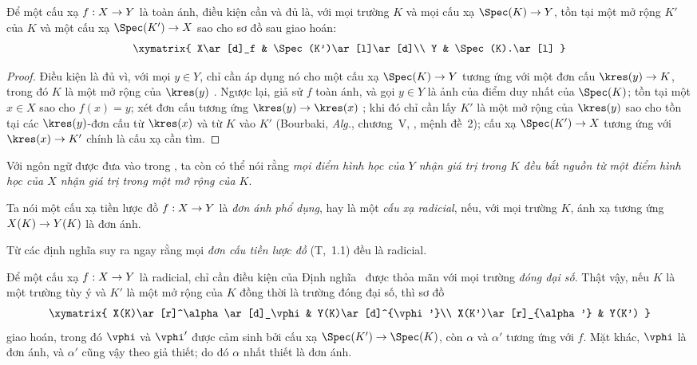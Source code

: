 \documentclass[oneside]{amsart}
\makeatletter
\newcommand{\ega@arrow}[2]{\mathchoice{#1}{#2}{#2}{#2}}
\renewcommand{\to}{\ega@arrow{\longrightarrow}{\rightarrow}}
\newcommand{\oldpage}[2][]{{\marginnote{\normalfont\textbf{#1}~|~#2}}\ignorespaces}
\let\EGAOriginalLabel\label
\renewcommand{\label}[1]{\phantomsection\EGAOriginalLabel{#1}}
\makeatother
\begin{document}
\begin{proposition}[3.5.3]
\label{I.3.5.3}
Để một cấu xạ $f:X\to Y$ là toàn ánh, điều kiện cần và đủ là, với mọi trường
$K$ và mọi cấu xạ $\Spec(K)\to Y$, tồn tại một mở rộng $K'$ của $K$ và một
cấu xạ $\Spec(K')\to X$ sao cho sơ đồ sau giao hoán:
\[
  \xymatrix{
    X\ar[d]_f &
    \Spec(K')\ar[l]\ar[d]\\
    Y &
    \Spec(K).\ar[l]
  }
\]
\end{proposition}

\begin{proof}
Điều kiện là đủ vì, với mọi $y\in Y$, chỉ cần áp dụng nó cho một cấu xạ
$\Spec(K)\to Y$ tương ứng với một đơn cấu $\kres(y)\to K$, trong đó $K$ là
một mở rộng của $\kres(y)$ .
Ngược lại, giả sử $f$ toàn ánh, và gọi $y\in Y$ là ảnh của điểm duy nhất của
$\Spec(K)$; tồn tại một $x\in X$ sao cho $f(x)=y$; xét đơn cấu tương ứng
$\kres(y)\to\kres(x)$ ; khi đó chỉ cần lấy $K'$ là một mở rộng
của $\kres(y)$ sao cho tồn tại các $\kres(y)$-đơn cấu từ $\kres(x)$ và từ
$K$ vào $K'$ (Bourbaki, \emph{Alg.}, chương~V, , mệnh đề~2);
cấu xạ $\Spec(K')\to X$ tương ứng với $\kres(x)\to K'$ chính là cấu xạ cần
tìm.
\end{proof}

Với ngôn ngữ được đưa vào trong , ta còn có thể nói rằng
\emph{mọi điểm hình học của $Y$ nhận giá trị trong $K$ đều bắt nguồn từ một
điểm hình học của $X$ nhận giá trị trong một mở rộng của $K$}.

\begin{definition}[3.5.4]
\label{I.3.5.4}
Ta nói một cấu xạ tiền lược đồ $f:X\to Y$ là \emph{đơn ánh phổ dụng}, hay là
một \emph{cấu xạ radicial}, nếu, với mọi trường $K$, ánh xạ tương ứng
$X(K)\to Y(K)$ là đơn ánh.
\end{definition}

Từ các định nghĩa suy ra ngay rằng mọi \emph{đơn cấu tiền lược đồ} (T,~1.1)
đều là radicial.

\begin{env}[3.5.5]
\label{I.3.5.5}
Để một cấu xạ $f:X\to Y$ là radicial, chỉ cần điều kiện của Định
nghĩa~ được thỏa mãn với mọi trường \emph{đóng đại số}.
Thật vậy, nếu $K$ là một trường tùy ý và $K'$ là một mở rộng của $K$ đồng
thời là trường đóng đại số, thì sơ đồ
\[
  \xymatrix{
    X(K)\ar[r]^\alpha\ar[d]_\vphi &
    Y(K)\ar[d]^{\vphi'}\\
    X(K')\ar[r]_{\alpha'} &
    Y(K')
  }
\]
\oldpage[I]{116}
giao hoán, trong đó $\vphi$ và $\vphi'$ được cảm sinh bởi cấu xạ
$\Spec(K')\to\Spec(K)$, còn $\alpha$ và $\alpha'$ tương ứng với $f$.
Mặt khác, $\vphi$ là đơn ánh, và $\alpha'$ cũng vậy theo giả thiết; do đó
$\alpha$ nhất thiết là đơn ánh.
\end{env}
\end{document}
